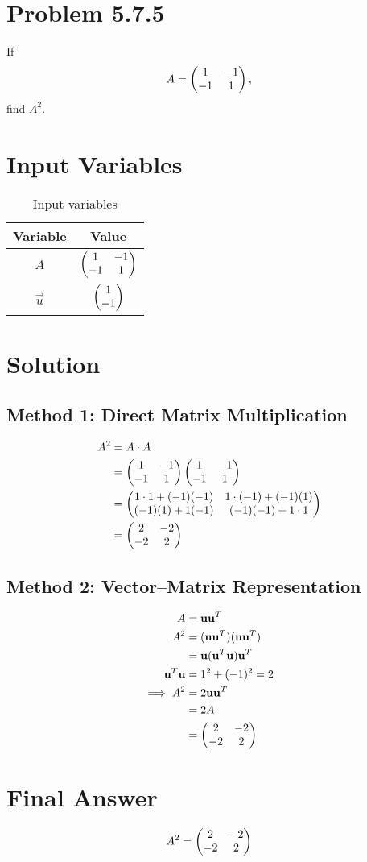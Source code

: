 \documentclass[12pt]{article}
\begin{document}
\section*{Problem 5.7.5}
If 
\begin{align}
A = \begin{pmatrix}1 & -1 \\ -1 & 1\end{pmatrix},
\end{align}
find $A^2$.

\section*{Input Variables}
\begin{table}[H]
\centering
\begin{tabular}{|c|c|}
\hline
\textbf{Variable} & \textbf{Value} \\
\hline
$A$ & $\begin{pmatrix}1 & -1 \\ -1 & 1\end{pmatrix}$ \\
\hline
$\vec{u}$ & $\begin{pmatrix}1 \\ -1\end{pmatrix}$ \\
\hline
\end{tabular}
\caption{Input variables}
\end{table}

\section*{Solution}

\subsection*{Method 1: Direct Matrix Multiplication}
\begin{align}
A^2 &= A \cdot A \\
&= \begin{pmatrix}1 & -1 \\ -1 & 1\end{pmatrix}\begin{pmatrix}1 & -1 \\ -1 & 1\end{pmatrix} \\
&= \begin{pmatrix}1\cdot 1 + (-1)(-1) & 1\cdot (-1) + (-1)(1) \\ (-1)(1) + 1(-1) & (-1)(-1) + 1\cdot 1\end{pmatrix} \\
&= \begin{pmatrix}2 & -2 \\ -2 & 2\end{pmatrix}
\end{align}

\subsection*{Method 2: Vector--Matrix Representation}
\begin{align}
A &= \mathbf{u}\mathbf{u}^T \\
A^2 &= (\mathbf{u}\mathbf{u}^T)(\mathbf{u}\mathbf{u}^T) \\
&= \mathbf{u}(\mathbf{u}^T \mathbf{u})\mathbf{u}^T \\
\mathbf{u}^T \mathbf{u} &= 1^2 + (-1)^2 = 2 \\
\implies A^2 &= 2\mathbf{u}\mathbf{u}^T \\
&= 2A \\
&= \begin{pmatrix}2 & -2 \\ -2 & 2\end{pmatrix}
\end{align}

\section*{Final Answer}
\begin{align}
A^2 = \begin{pmatrix}2 & -2 \\ -2 & 2\end{pmatrix}
\end{align}
\end{document}

